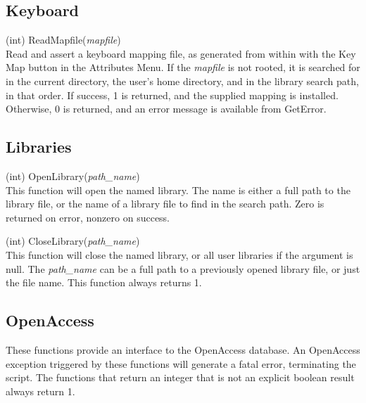 \subsection{Keyboard}

\begin{description}
\item{(int) \vt ReadMapfile({\it mapfile\/})}\\
Read and assert a keyboard mapping file, as generated from within
{\Xic} with the {\cb Key Map} button in the {\cb Attributes Menu}.  If
the {\it mapfile} is not rooted, it is searched for in the current
directory, the user's home directory, and in the library search path,
in that order.  If success, 1 is returned, and the supplied mapping is
installed.  Otherwise, 0 is returned, and an error message is
available from {\vt GetError}.
\end{description}


\subsection{Libraries}

\begin{description}
\item{(int) \vt OpenLibrary({\it path\_name\/})}\\
This function will open the named library.  The name is either a full
path to the library file, or the name of a library file to find in the
search path.  Zero is returned on error, nonzero on success.

\item{(int) \vt CloseLibrary({\it path\_name\/})}\\
This function will close the named library, or all user libraries if
the argument is null.  The {\it path\_name} can be a full path to a
previously opened library file, or just the file name.  This function
always returns 1.

\end{description}


\ifoa
\subsection{OpenAccess}

These functions provide an interface to the OpenAccess database.  An
OpenAccess exception triggered by these functions will generate a
fatal error, terminating the script.  The functions that return an
integer that is not an explicit boolean result always return 1.

